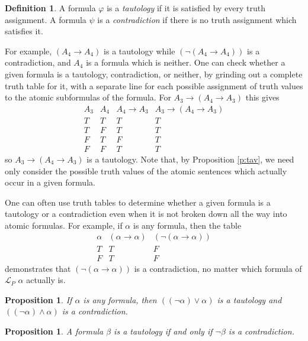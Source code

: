 \documentclass[12pt]{amsbook}
\theoremstyle{plain}
\newtheorem{prop}[thm]{Proposition}
\theoremstyle{definition}
\newtheorem{defn}{Definition}[chapter]
\theoremstyle{remark}
\begin{document}
\begin{defn} \label{d:taco}  
A formula $\varphi$ is a {\em tautology\/} if it is satisfied by every truth assignment.  A formula $\psi$ is a {\em contradiction\/} if there is no truth assignment which satisfies it.
\end{defn}

For example,  $(A_4 \to A_4)$ is a tautology while $(\lnot (A_4 \to A_4))$ is a contradiction,  and $A_4$ is a formula which is neither.  One can check whether a given formula is a tautology,  contradiction,  or neither,  by grinding out a complete truth table for it,  with a separate line for each possible assignment of truth values to the atomic subformulas of the formula.  For $A_3 \to (A_4 \to A_3)$ this gives 
\[\begin{array}{c|c|c|c}
A_3 & A_4 & A_4 \to A_3 & A_3 \to (A_4 \to A_3) \\
\hline
T & T & T & T \\
T & F & T & T \\
F & T & F & T \\
F & F & T & T
\end{array}\]
so $A_3 \to (A_4 \to A_3)$ is a tautology.  Note that,  by Proposition \ref{p:tav},  we need only consider the possible truth values of the atomic sentences which actually occur in a given formula.

One can often use truth tables to determine whether a given formula is a tautology or a contradiction even when it is not broken down all the way into atomic formulas.  For example,  if $\alpha$ is any formula,  then the table
\[\begin{array}{c|c|c}
\alpha &  (\alpha \to \alpha) & (\lnot (\alpha \to \alpha)) \\ \hline
T & T & F \\
F & T & F
\end{array}\]
demonstrates that $(\lnot (\alpha \to \alpha))$ is a contradiction,  no matter which formula of $\mathcal{L}_P$ $\alpha$ actually is.

\begin{prop} \label{p:two5}
If $\alpha$ is any formula,  then $((\lnot \alpha) \lor \alpha)$ is a tautology and $((\lnot \alpha) \land \alpha)$ is a  contradiction.
\end{prop}

\begin{prop} \label{p:two6}
A formula $\beta$ is a tautology if and only if $\lnot \beta$ is a contradiction.
\end{prop}
\end{document}
